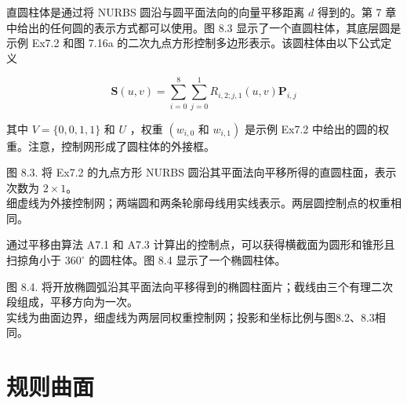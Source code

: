 \documentclass[../main.tex]{subfiles}
\begin{document}
直圆柱体是通过将 NURBS 圆沿与圆平面法向的向量平移距离 \(d\) 得到的。第 7 章中给出的任何圆的表示方式都可以使用。图 8.3 显示了一个直圆柱体，其底层圆是示例 Ex7.2 和图 7.16a 的二次九点方形控制多边形表示。该圆柱体由以下公式定义

\[
\mathbf{S}\left( {u,v}\right)  = \mathop{\sum }\limits_{{i = 0}}^{8}\mathop{\sum }\limits_{{j = 0}}^{1}{R}_{i,2;j,1}\left( {u,v}\right) {\mathbf{P}}_{i,j} \tag{8.3}
\]

其中 \(V = \{ 0,0,1,1\}\) 和 \(U\) ，权重 \(\left( {w}_{i,0}\right.\) 和 \(\left. {w}_{i,1}\right)\) 是示例 Ex7.2 中给出的圆的权重。注意，控制网形成了圆柱体的外接框。

\begin{center}
\begin{minipage}{28cm}
\vspace*{.6\baselineskip}
\centering
{}
\par\smallskip
图 8.3. 将 Ex7.2 的九点方形 NURBS 圆沿其平面法向平移所得的直圆柱面，表示次数为 $2\times1$。\\
细虚线为外接控制网；两端圆和两条轮廓母线用实线表示。两层圆控制点的权重相同。
\end{minipage}
\end{center}

通过平移由算法 A7.1 和 A7.3 计算出的控制点，可以获得横截面为圆形和锥形且扫掠角小于 \({360}^{ \circ  }\) 的圆柱体。图 8.4 显示了一个椭圆柱体。











\begin{center}
\begin{minipage}{28cm}
\vspace*{.6\baselineskip}
\centering
{}
\par\smallskip
图 8.4. 将开放椭圆弧沿其平面法向平移得到的椭圆柱面片；截线由三个有理二次段组成，平移方向为一次。\\
实线为曲面边界，细虚线为两层同权重控制网；投影和坐标比例与图8.2、8.3相同。
\end{minipage}
\end{center}

\section{规则曲面}
\end{document}
